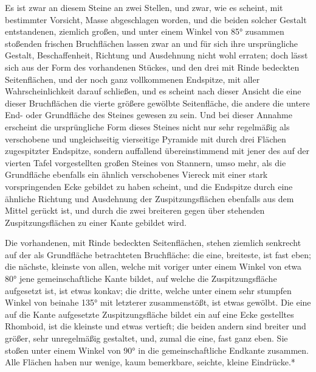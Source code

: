 \documentclass[a4paper, 11pt, oneside, german]{article}
\begin{document}
Es ist zwar an diesem Steine an zwei Stellen, und zwar, wie es scheint, mit bestimmter Vorsicht, Masse abgeschlagen worden, und die beiden solcher Gestalt entstandenen, ziemlich großen, und unter einem Winkel von 85° zusammen stoßenden frischen Bruchflächen lassen zwar an und für sich ihre ursprüngliche Gestalt, Beschaffenheit, Richtung und Ausdehnung nicht wohl erraten; doch lässt sich aus der Form des vorhandenen Stückes, und den drei mit Rinde bedeckten Seitenflächen, und der noch ganz vollkommenen Endspitze, mit aller Wahrscheinlichkeit darauf schließen, und es scheint nach dieser Ansicht die eine dieser Bruchflächen die vierte größere gewölbte Seitenfläche, die andere die untere End- oder Grundfläche des Steines gewesen zu sein. Und bei dieser Annahme erscheint die ursprüngliche Form dieses Steines nicht nur sehr regelmäßig als verschobene und ungleichseitig vierseitige Pyramide mit durch drei Flächen zugespitzter Endspitze, sondern auffallend übereinstimmend mit jener des auf der vierten Tafel vorgestellten großen Steines von Stannern, umso mehr, als die Grundfläche ebenfalls ein ähnlich verschobenes Viereck mit einer stark vorspringenden Ecke gebildet zu haben scheint, und die Endspitze durch eine ähnliche Richtung und Ausdehnung der Zuspitzungsflächen ebenfalls aus dem Mittel gerückt ist, und durch die zwei breiteren gegen über stehenden Zuspitzungsflächen zu einer Kante gebildet wird.

Die vorhandenen, mit Rinde bedeckten Seitenflächen, stehen ziemlich senkrecht auf der als Grundfläche betrachteten Bruchfläche: die eine, breiteste, ist fast eben; die nächste, kleinste von allen, welche mit voriger unter einem Winkel von etwa 80° jene gemeinschaftliche Kante bildet, auf welche die Zuspitzungsfläche aufgesetzt ist, ist etwas konkav; die dritte, welche unter einem sehr stumpfen Winkel von beinahe 135° mit letzterer zusammenstößt, ist etwas gewölbt. Die eine auf die Kante aufgesetzte Zuspitzungsfläche bildet ein auf eine Ecke gestelltes Rhomboid, ist die kleinste und etwas vertieft; die beiden andern sind breiter und größer, sehr unregelmäßig gestaltet, und, zumal die eine, fast ganz eben. Sie stoßen unter einem Winkel von 90° in die gemeinschaftliche Endkante zusammen. Alle Flächen haben nur wenige, kaum bemerkbare, seichte, kleine Eindrücke.*
\end{document}
